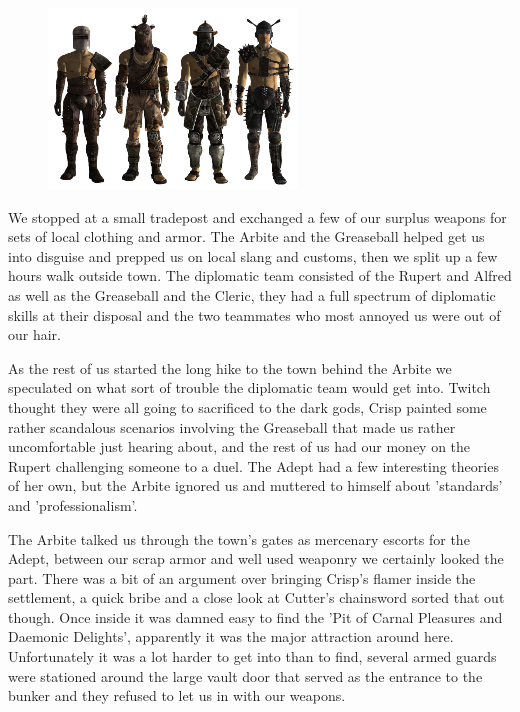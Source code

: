 \begin{figure}
	\begin{center}
		\includegraphics[width=\figwidth]{pics/6/14.png}
	\end{center}
\end{figure}
We stopped at a small tradepost and exchanged a few of our surplus weapons for sets of local clothing and armor. 
The Arbite and the Greaseball helped get us into disguise and prepped us on local slang and customs, then we split up a few hours walk outside town. 
The diplomatic team consisted of the Rupert and Alfred as well as the Greaseball and the Cleric, they had a full spectrum of diplomatic skills at their disposal and the two teammates who most annoyed us were out of our hair. 

As the rest of us started the long hike to the town behind the Arbite we speculated on what sort of trouble the diplomatic team would get into. 
Twitch thought they were all going to sacrificed to the dark gods, Crisp painted some rather scandalous scenarios involving the Greaseball that made us rather uncomfortable just hearing about, and the rest of us had our money on the Rupert challenging someone to a duel. 
The Adept had a few interesting theories of her own, but the Arbite ignored us and muttered to himself about 'standards' and 'professionalism'.

The Arbite talked us through the town's gates as mercenary escorts for the Adept, between our scrap armor and well used weaponry we certainly looked the part.
There was a bit of an argument over bringing Crisp's flamer inside the settlement, a quick bribe and a close look at Cutter's chainsword sorted that out though.
Once inside it was damned easy to find the 'Pit of Carnal Pleasures and Daemonic Delights', apparently it was the major attraction around here. 
Unfortunately it was a lot harder to get into than to find, several armed guards were stationed around the large vault door that served as the entrance to the bunker and they refused to let us in with our weapons.

